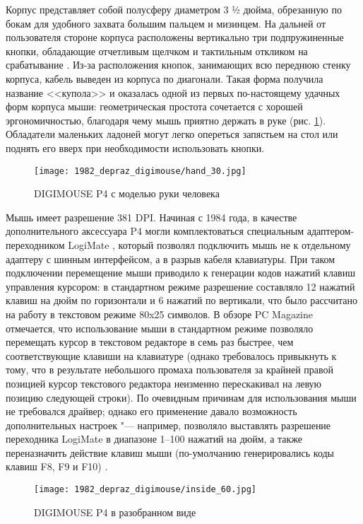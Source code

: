 \documentclass[11pt, a4paper]{article}
\begin{document}
Корпус представляет собой полусферу диаметром 3 ½ дюйма, обрезанную по бокам для удобного захвата большим пальцем и мизинцем. На дальней от пользователя стороне корпуса расположены вертикально три подпружиненные кнопки, обладающие отчетливым щелчком и тактильным откликом на срабатывание \cite{oldmouse}. Из-за расположения кнопок, занимающих всю переднюю стенку корпуса, кабель выведен из корпуса по диагонали. Такая форма получила название <<купола>> и оказалась одной из первых по-настоящему удачных форм корпуса мыши: геометрическая простота сочетается с хорошей эргономичностью, благодаря чему мышь приятно держать в руке (рис. \ref{fig:DIGIMOUSEP4Hand}). Обладатели маленьких ладоней могут легко опереться запястьем на стол или поднять его вверх при необходимости использовать кнопки.

\begin{figure}[h]
    \centering
    \texttt{[image: 1982\_depraz\_digimouse/hand\_30.jpg]}
    \caption{DIGIMOUSE P4 с моделью руки человека}
    \label{fig:DIGIMOUSEP4Hand}
\end{figure}

Мышь имеет разрешение 381 DPI. Начиная с 1984 года, в качестве дополнительного аксессуара P4 могли комплектоваться специальным адаптером-переходником LogiMate \cite{oldmouse}, который позволял подключить мышь не к отдельному адаптеру с шинным интерфейсом, а в разрыв кабеля клавиатуры. При таком подключении перемещение мыши приводило к генерации кодов нажатий клавиш управления курсором: в стандартном режиме разрешение составляло 12 нажатий клавиш на дюйм по горизонтали и 6 нажатий по вертикали, что было рассчитано на работу в текстовом режиме 80x25 символов. В обзоре PC Magazine отмечается, что использование мыши в стандартном режиме позволяло перемещать курсор в текстовом редакторе в семь раз быстрее, чем соответствующие клавиши на клавиатуре (однако требовалось привыкнуть к тому, что в результате небольшого промаха пользователя за крайней правой позицией курсор текстового редактора неизменно перескакивал на левую позицию следующей строки). По очевидным причинам для использования мыши не требовался драйвер; однако его применение давало возможность дополнительных настроек "--- например, позволяло выставлять разрешение переходника LogiMate в диапазоне 1--100 нажатий на дюйм, а также переназначить действие клавиш мыши (по-умолчанию генерировались коды клавиш F8, F9 и F10) \cite{DIGIMOUSE}.

 \begin{figure}[h]
    \centering
    \texttt{[image: 1982\_depraz\_digimouse/inside\_60.jpg]}
    \caption{DIGIMOUSE P4 в разобранном виде}
    \label{fig:DIGIMOUSEP4Inside}
\end{figure}
\end{document}
